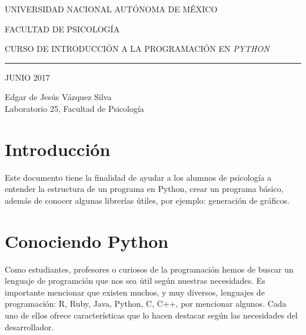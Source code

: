 \documentclass[a4paper, openright, 12pt]{article}
\author{Grupo de trabajo PAPIME}
\date{MAYO 2017}
\begin{document}
\begin{titlepage}

    \begin{center}
        \vspace{-1in}
        \vspace{0.35in}

        \begin{large}
            UNIVERSIDAD NACIONAL AUTÓNOMA DE MÉXICO
            \vspace{0.70in}

            FACULTAD DE PSICOLOGÍA
            \vspace{0.90in}

            CURSO DE INTRODUCCIÓN A LA PROGRAMACIÓN EN
            \textit{PYTHON}

            \vspace{4.0in}
            \rule{110mm}{0.02mm}


            \vspace{0.25in}
            JUNIO 2017

            \vspace{0.20in}
            Edgar de Jesús Vázquez Silva\\
            Laboratorio 25, Facultad de Psicología


        \end{large}


    \end{center}

\end{titlepage}


\tableofcontents
\newpage{}


  \section{Introducción}
    Este documento tiene la finalidad de ayudar a los alumnos de psicología a entender la estructura de un programa en Python, crear un programa básico, además de conocer algunas librerías útiles, por ejemplo: generación de gráficos.

  \newpage{}


  \section{Conociendo Python}
    Como estudiantes, profesores o curiosos de la programación hemos de buscar un lenguaje de programción que nos sea útil según nuestras necesidades. Es importante mencionar que existen muchos, y muy diversos, lenguajes de programación: R, Ruby, Java, Python, C, C++, por mencionar algunos. Cada uno de ellos ofrece características que lo hacen destacar según las necesidades del desarrollador.\\
\end{document}
